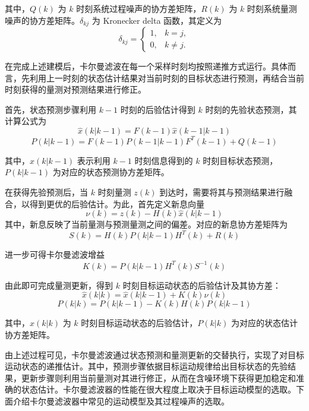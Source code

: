 \documentclass{xdupgthesis}
\begin{document}
其中，$Q(k)$ 为 $k$ 时刻系统过程噪声的协方差矩阵，$R(k)$ 为 $k$ 时刻系统量测噪声的协方差矩阵。$\delta_{kj}$ 为 Kronecker delta 函数，其定义为
\begin{equation}
	\delta_{kj}=
	\begin{cases}
		1, & k=j,\\
		0, & k\neq j.
	\end{cases}
\end{equation}

在完成上述建模后，卡尔曼滤波在每一个采样时刻均按照递推方式运行。具体而言，先利用上一时刻的状态估计结果对当前时刻的目标状态进行预测，再结合当前时刻获得的量测对预测结果进行修正。

首先，状态预测步骤利用 $k-1$ 时刻的后验估计得到 $k$ 时刻的先验状态预测，其计算公式为
\begin{equation}
	\hat{x}(k|k-1)=F(k-1)\hat{x}(k-1|k-1)
\end{equation}
\begin{equation}
	P(k|k-1)=F(k-1)P(k-1|k-1)F^{T}(k-1)+Q(k-1)
\end{equation}

其中，$\hat{x}(k|k-1)$ 表示利用 $k-1$ 时刻信息得到的 $k$ 时刻目标状态预测，$P(k|k-1)$ 为对应的状态预测协方差矩阵。

在获得先验预测后，当 $k$ 时刻量测 $z(k)$ 到达时，需要将其与预测结果进行融合，以得到更优的后验估计。为此，首先定义新息向量
\begin{equation}
	\nu(k)=z(k)-H(k)\hat{x}(k|k-1)
\end{equation}
其中，新息反映了当前量测与预测量测之间的偏差。对应的新息协方差矩阵为
\begin{equation}
	S(k)=H(k)P(k|k-1)H^{T}(k)+R(k)
\end{equation}

进一步可得卡尔曼滤波增益
\begin{equation}
	K(k)=P(k|k-1)H^{T}(k)S^{-1}(k)
\end{equation}

由此即可完成量测更新，得到 $k$ 时刻目标运动状态的后验估计及其协方差：
\begin{equation}
	\hat{x}(k|k)=\hat{x}(k|k-1)+K(k)\nu(k)
\end{equation}
\begin{equation}
	P(k|k)=P(k|k-1)-K(k)H(k)P(k|k-1)
\end{equation}

其中，$\hat{x}(k|k)$ 为 $k$ 时刻目标运动状态的后验估计，$P(k|k)$ 为对应的状态估计协方差矩阵。

由上述过程可见，卡尔曼滤波通过状态预测和量测更新的交替执行，实现了对目标运动状态的递推估计。其中，预测步骤依据目标运动规律给出目标状态的先验结果，更新步骤则利用当前量测对其进行修正，从而在含噪环境下获得更加稳定和准确的状态估计。卡尔曼滤波器的性能在很大程度上取决于目标运动模型的选取。下面介绍卡尔曼滤波器中常见的运动模型及其过程噪声的选取。
\end{document}
